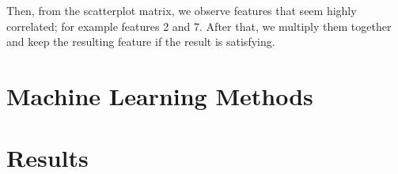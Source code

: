 \documentclass[10pt,conference,compsocconf]{IEEEtran}
\begin{document}
Then, from the scatterplot matrix, we observe features that seem highly correlated; for example features 2 and 7. After that, we multiply them together and keep the resulting feature if the result is satisfying.

\section{Machine Learning Methods}

\section{Results}



\end{document}
